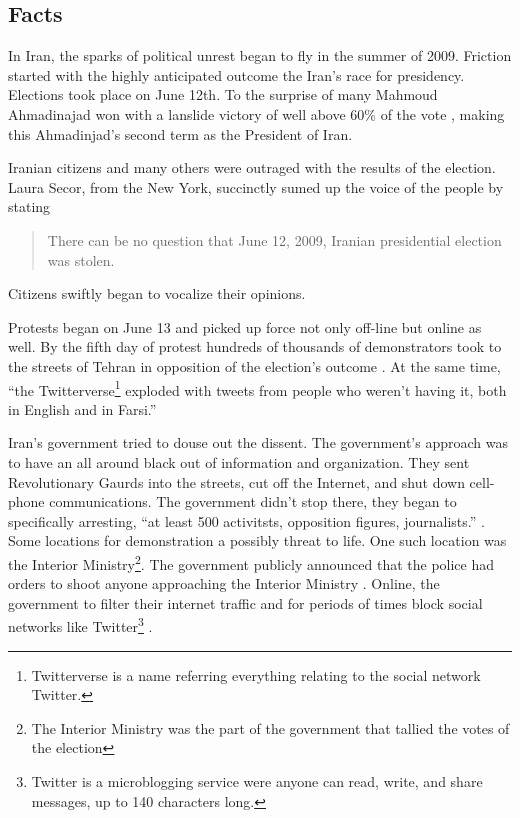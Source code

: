 \documentclass[11pt]{article}
\begin{document}
\begin{multicols}{2}
\setcounter{page}{1}
\section{Facts} 

In Iran, the sparks of political unrest began to fly in the summer of 2009.
Friction started with the highly anticipated outcome the Iran's race for
presidency. Elections took place on June 12th. To the surprise of many Mahmoud
Ahmadinajad won with a lanslide victory of well above 60\% of the vote
\cite{TheIranianVote, IranianElectionResultsByProvince}, making this
Ahmadinjad's second term as the President of Iran.

Iranian citizens and many others were outraged with the results of the election.
Laura Secor, from the New York, succinctly sumed up the voice of the people by
stating \begin{quotation} There can be no question that June 12, 2009, Iranian
presidential election was stolen. \cite{TheIranianVote}\end{quotation} Citizens
swiftly began to vocalize their opinions.

Protests began on June 13 and picked up force not only off-line but online as
well. By the fifth day of protest hundreds of thousands of demonstrators took to
the streets of Tehran in opposition of the election's outcome
\cite{IranProtestsFifthDayOfUnrest}. At the same time, ``the
Twitterverse\footnote{Twitterverse is a name referring everything relating to
the social network Twitter.} exploded with tweets from people who weren't having
it, both in English and in Farsi.'' \cite{WhyTwitterIsTheMedium}

Iran's government tried to douse out the dissent. The government's approach was
to have an all around black out of information and organization. They sent
Revolutionary Gaurds into the streets, cut off the Internet, and shut down
cell-phone communications\cite{TheIranianVote}. The government didn't stop
there, they began to specifically arresting, ``at least 500 activitsts,
opposition figures, journalists.'' \cite{IranProtestsFifthDayOfUnrest}.  Some
locations for demonstration a possibly threat to life.  One such location was
the Interior Ministry\footnote{The Interior Ministry was the part of the
government that tallied the votes of the election}. The government publicly
announced that the police had orders to shoot anyone approaching the Interior
Ministry \cite{TheIranianVote}. Online, the government to filter their internet
traffic and for periods of times block social networks like
Twitter\footnote{Twitter is a microblogging service were anyone can read, write,
and share messages, up to 140 characters long.\cite{WhatIsTwitter}}
\cite{IranBlocksFacebookTwitter}.


\end{multicols}
\end{document}
